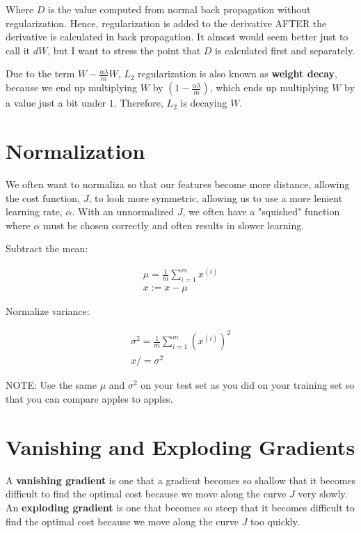 \documentclass{article}
\begin{document}
Where $D$ is the value computed from normal back propagation without regularization.  Hence, regularization is added to the derivative AFTER the derivative is calculated in back propagation.  It almost would seem better just to call it $dW$, but I want to stress the point that $D$ is calculated first and separately.

Due to the term $W - \frac{\alpha\lambda}{m} W$, $L_2$ regularization is also known as \textbf{weight decay}, because we end up multiplying $W$ by $(1 - \frac{\alpha\lambda}{m})$, which ends up multiplying $W$ by a value just a bit under $1$.  Therefore, $L_2$ is decaying $W$.

\section{Normalization}

We often want to normaliza so that our features become more distance, allowing the cost function, $J$, to look more symmetric, allowing us to use a more lenient learning rate, $\alpha$.  With an unnormalized $J$, we often have a "squished" function where $\alpha$ must be chosen correctly and often results in slower learning.

Subtract the mean:

\begin{gather}
\mu = \frac{1}{m} \sum_{i=1}^{m} x^{(i)} \\
x := x - \mu
\end{gather}


Normalize variance:

\begin{gather}
\sigma^2 = \frac{1}{m} \sum_{i=1}^{m} (x^{(i)})^2 \\
x /= \sigma^2
\end{gather}

NOTE: Use the same $\mu$ and $\sigma^2$ on your test set as you did on your training set so that you can compare apples to apples.

\section{Vanishing and Exploding Gradients}

A \textbf{vanishing gradient} is one that a gradient becomes so shallow that it becomes difficult to find the optimal cost because we move along the curve $J$ very slowly.  An \textbf{exploding gradient} is one that becomes so steep that it becomes difficult to find the optimal cost because we move along the curve $J$ too quickly.
\end{document}
